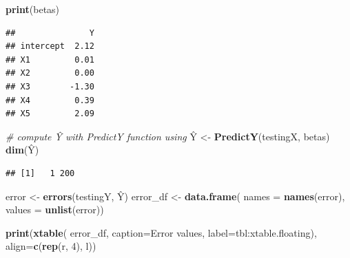 \documentclass[a4paper,conference]{IEEEtran}
\newenvironment{Shaded}{\begin{snugshade}}{\end{snugshade}}
\newcommand{\AttributeTok}[1]{\textcolor[rgb]{0.13,0.29,0.53}{#1}}
\newcommand{\CommentTok}[1]{\textcolor[rgb]{0.56,0.35,0.01}{\textit{#1}}}
\newcommand{\DecValTok}[1]{\textcolor[rgb]{0.00,0.00,0.81}{#1}}
\newcommand{\FunctionTok}[1]{\textcolor[rgb]{0.13,0.29,0.53}{\textbf{#1}}}
\newcommand{\NormalTok}[1]{#1}
\newcommand{\OtherTok}[1]{\textcolor[rgb]{0.56,0.35,0.01}{#1}}
\newcommand{\StringTok}[1]{\textcolor[rgb]{0.31,0.60,0.02}{#1}}
\begin{document}
\begin{Shaded}
\begin{Highlighting}[]
\FunctionTok{print}\NormalTok{(betas)}
\end{Highlighting}
\end{Shaded}

\begin{verbatim}
##               Y
## intercept  2.12
## X1         0.01
## X2         0.00
## X3        -1.30
## X4         0.39
## X5         2.09
\end{verbatim}

\begin{Shaded}
\begin{Highlighting}[]
\CommentTok{\# compute Ŷ with PredictY function using }
\NormalTok{Ŷ }\OtherTok{\textless{}{-}} \FunctionTok{PredictY}\NormalTok{(testingX,}
\NormalTok{              betas)}
\FunctionTok{dim}\NormalTok{(Ŷ) }
\end{Highlighting}
\end{Shaded}

\begin{verbatim}
## [1]   1 200
\end{verbatim}

\begin{Shaded}
\begin{Highlighting}[]
\NormalTok{error }\OtherTok{\textless{}{-}} \FunctionTok{errors}\NormalTok{(testingY, Ŷ)}
\NormalTok{error\_df }\OtherTok{\textless{}{-}} \FunctionTok{data.frame}\NormalTok{(}
  \AttributeTok{names =} \FunctionTok{names}\NormalTok{(error), }
  \AttributeTok{values =} \FunctionTok{unlist}\NormalTok{(error))}
\end{Highlighting}
\end{Shaded}

\begin{Shaded}
\begin{Highlighting}[]
\FunctionTok{print}\NormalTok{(}\FunctionTok{xtable}\NormalTok{(}
\NormalTok{    error\_df,}
    \AttributeTok{caption=}\StringTok{\textquotesingle{}Error values\textquotesingle{}}\NormalTok{,}
    \AttributeTok{label=}\StringTok{\textquotesingle{}tbl:xtable.floating\textquotesingle{}}\NormalTok{),}
    \AttributeTok{align=}\FunctionTok{c}\NormalTok{(}\FunctionTok{rep}\NormalTok{(}\StringTok{\textquotesingle{}r\textquotesingle{}}\NormalTok{, }\DecValTok{4}\NormalTok{), }\StringTok{\textquotesingle{}l\textquotesingle{}}\NormalTok{))}
\end{Highlighting}
\end{Shaded}
\end{document}
